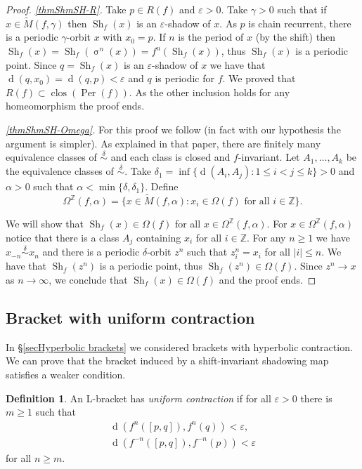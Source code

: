\documentclass[12pt]{amsart}
\DeclareMathOperator{\per}{Per}
\DeclareMathOperator{\shift}{\sigma}
\theoremstyle{plain}
\theoremstyle{definition}
\newtheorem{df}[thm]{Definition}
\theoremstyle{remark}
\DeclareMathOperator{\clos}{clos}
\DeclareMathOperator{\dist}{d}
\DeclareMathOperator{\shm}{Sh}
\newcommand{\Z}{\mathbb Z}
\renewcommand{\epsilon}{\varepsilon}
\newcommand{\tM}{\tilde{M}}
\begin{document}
\begin{proof}
	\textit{\ref{thmShmSH-R}.} Take $p\in R(f)$ and $\epsilon>0$.
	Take $\gamma>0$ such that if
	$x\in \tM(f,\gamma)$ then $\shm_f(x)$ is an $\epsilon$-shadow of $x$.
	As $p$ is chain recurrent, there is a periodic $\gamma$-orbit $x$ with $x_0=p$.
	If $n$ is the period of $x$ (by the shift) then
	$\shm_f(x)=\shm_f(\shift^n(x))=f^n(\shm_f(x))$, thus $\shm_f(x)$ is a periodic point.
	Since $q=\shm_f(x)$ is an $\epsilon$-shadow of $x$ we have that $\dist(q,x_0)=\dist(q,p)<\epsilon$ and $q$ is periodic for $f$. We proved that $R(f)\subset\clos(\per(f))$. As the other inclusion holds for any homeomorphism the proof ends.

	\textit{\ref{thmShmSH-Omega}.}
	For this proof we follow \cite{Aoki83} (in fact with our hypothesis the argument is simpler).
	As explained in that paper, there are finitely many equivalence classes of $\overset\delta\sim$ and each class is closed and $f$-invariant.
	Let $A_1,\dots,A_k$ be the equivalence classes of $\overset\delta\sim$.
	Take $\delta_1=\inf\{\dist(A_i,A_j):1\leq i<j\leq k\}>0$ and
	$\alpha>0$ such that $\alpha<\min\{\delta,\delta_1\}$.
	Define
	\[
	\Omega^\Z(f,\alpha)=\{x\in \tM(f,\alpha): x_i\in\Omega(f) \text{ for all }i\in\Z\}.
	\]

	We will show that $\shm_f(x)\in\Omega(f)$ for all $x\in\Omega^\Z(f,\alpha)$.
	For $x\in\Omega^\Z(f,\alpha)$
	notice that there is a class $A_j$ containing $x_i$ for all $i\in\Z$.
	For any $n\geq 1$ we have $x_{-n}\overset\delta\sim x_n$ and there is a periodic
	$\delta$-orbit $z^n$ such that $z^n_i=x_i$ for all $|i|\leq n$.
	We have that $\shm_f(z^n)$ is a periodic point, thus $\shm_f(z^n)\in\Omega(f)$.
	Since $z^n\to x$ as $n\to\infty$, we conclude that $\shm_f(x)\in\Omega(f)$ and the proof ends.
\end{proof}

\subsection{Bracket with uniform contraction}
\label{secBracket with uniform contraction}
In \S\ref{secHyperbolic brackets} we considered brackets with hyperbolic contraction. We can prove that the bracket induced by a shift-invariant shadowing map satisfies a weaker condition.

\begin{df}
	An L-bracket has \textit{uniform contraction} if
	for all $\epsilon>0$ there is $m\geq 1$ such that
	\begin{align*}
		\dist(f^n([p,q]),f^n(q))<\epsilon,\\
		\dist(f^{-n}([p,q]),f^{-n}(p))<\epsilon
	\end{align*}
	for all $n\geq m$.
\end{df}
\end{document}
